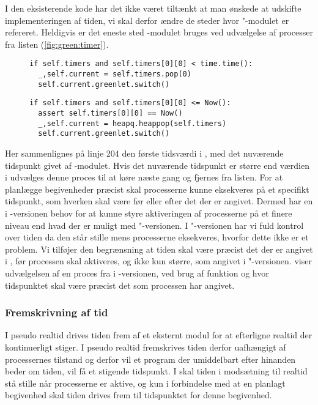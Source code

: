 I den eksisterende kode har det ikke været tiltænkt at man ønskede at udskifte implementeringen af tiden, vi skal derfor ændre de steder hvor "-modulet er refereret. Heldigvis er det eneste sted -modulet bruges  ved udvælgelse af processer fra  listen (\cref{fig:green:timer}). 
\begin{figure}[hbtp]
\begin{minipage}[c]{\linewidth}
\begin{lstlisting}[firstnumber=204, label=fig:green:timer, caption=Udvælgelse af proces fra listen timers (fra scheduling.py)]
if self.timers and self.timers[0][0] < time.time():
  _,self.current = self.timers.pop(0)
  self.current.greenlet.switch()
\end{lstlisting}
\end{minipage}
\begin{minipage}[c]{\linewidth}
\begin{lstlisting}[firstnumber=124, label=fig:sim:timer, caption=Udvælgelse af proces fra listen timers (fra simulation.py)]
if self.timers and self.timers[0][0] <= Now():
  assert self.timers[0][0] == Now()
  _,self.current = heapq.heappop(self.timers)
  self.current.greenlet.switch()
\end{lstlisting}
\end{minipage}
\end{figure}
Her sammenlignes på linje 204 den første tidsværdi i , med det nuværende tidspunkt givet af -modulet.
Hvis det nuværende tidspunkt er større end værdien i  udvælges denne proces til at køre næste gang og fjernes fra listen.
For at planlægge begivenheder præcist skal processerne kunne eksekveres på et specifikt tidspunkt, som hverken skal være før eller efter det der er angivet. Dermed har  \sched en i -versionen behov for at kunne  styre aktiveringen af processerne på et finere niveau end hvad der er muligt med "-versionen.  
I "-versionen har vi fuld kontrol over tiden da  den står stille mens processerne eksekveres, hvorfor dette ikke er et problem.
Vi  tilføjer den begrænsning at tiden skal være præcist det der er angivet i , før processen skal aktiveres, og ikke kun større, som angivet i "-versionen.  viser udvælgelsen af en proces fra  i -versionen, ved brug af  funktion og hvor tidspunktet skal være præcist det som processen har angivet.

\subsubsection{Fremskrivning af tid}
I pseudo realtid drives tiden frem af et eksternt modul for at efterligne realtid der kontinuerligt stiger. I pseudo realtid fremskrives tiden derfor uafhængigt af processernes tilstand og derfor vil et program der umiddelbart efter hinanden beder om tiden, vil  få et stigende  tidspunkt. I \des  skal tiden i modsætning til realtid stå stille når processerne er aktive, og kun i forbindelse med at en planlagt begivenhed skal tiden drives frem til tidspunktet for denne begivenhed.

